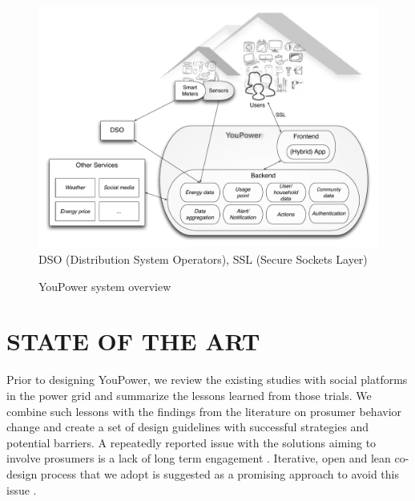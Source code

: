 \begin{figure}[t!]
\begin{center}\footnotesize
	\includegraphics[width=.7\textwidth]{img/civis_platform_overview.pdf}\\
	DSO (Distribution System Operators),  SSL (Secure Sockets Layer)
	\caption{YouPower system overview}\label{fig:platform}
\end{center}
\end{figure}

\section{\uppercase{State of the Art}}

\noindent Prior to designing YouPower, we review the existing studies with social platforms in the power grid and summarize the lessons learned from those trials. We combine such lessons with the findings from the literature on prosumer behavior change and create a set of design guidelines with successful strategies and potential barriers. A repeatedly reported issue with the solutions aiming to involve prosumers is a lack of long term engagement \cite{edward2015review}. Iterative, open and lean co-design process \cite{folstad2008living,klein2013ux,leffingwell2010agile} that we adopt is suggested as a promising approach to avoid this issue \cite{schwartz2014people}.

